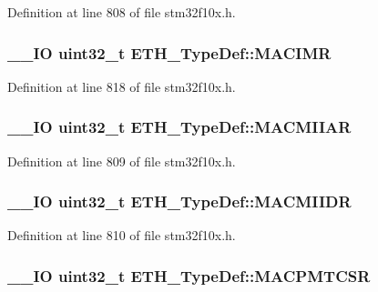 Definition at line 808 of file stm32f10x.\-h.

\hypertarget{struct_e_t_h___type_def_a45d413bc59caf6c14eb230266d7ab8c3}{
\subsubsection[{M\-A\-C\-I\-M\-R}]{\setlength{\rightskip}{0pt plus 5cm}\-\_\-\-\_\-\-I\-O {\bf uint32\-\_\-t} E\-T\-H\-\_\-\-Type\-Def\-::\-M\-A\-C\-I\-M\-R}}\label{struct_e_t_h___type_def_a45d413bc59caf6c14eb230266d7ab8c3}


Definition at line 818 of file stm32f10x.\-h.

\hypertarget{struct_e_t_h___type_def_af697fcc940139f7dcb483766420852be}{
\subsubsection[{M\-A\-C\-M\-I\-I\-A\-R}]{\setlength{\rightskip}{0pt plus 5cm}\-\_\-\-\_\-\-I\-O {\bf uint32\-\_\-t} E\-T\-H\-\_\-\-Type\-Def\-::\-M\-A\-C\-M\-I\-I\-A\-R}}\label{struct_e_t_h___type_def_af697fcc940139f7dcb483766420852be}


Definition at line 809 of file stm32f10x.\-h.

\hypertarget{struct_e_t_h___type_def_a3d4c60bb689285b937c939b36a1233a3}{
\subsubsection[{M\-A\-C\-M\-I\-I\-D\-R}]{\setlength{\rightskip}{0pt plus 5cm}\-\_\-\-\_\-\-I\-O {\bf uint32\-\_\-t} E\-T\-H\-\_\-\-Type\-Def\-::\-M\-A\-C\-M\-I\-I\-D\-R}}\label{struct_e_t_h___type_def_a3d4c60bb689285b937c939b36a1233a3}


Definition at line 810 of file stm32f10x.\-h.

\hypertarget{struct_e_t_h___type_def_a1deaafa44dbc3c8a2daaaf317dee5624}{
\subsubsection[{M\-A\-C\-P\-M\-T\-C\-S\-R}]{\setlength{\rightskip}{0pt plus 5cm}\-\_\-\-\_\-\-I\-O {\bf uint32\-\_\-t} E\-T\-H\-\_\-\-Type\-Def\-::\-M\-A\-C\-P\-M\-T\-C\-S\-R}}\label{struct_e_t_h___type_def_a1deaafa44dbc3c8a2daaaf317dee5624}


